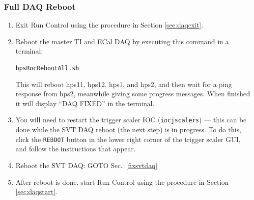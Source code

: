 \documentclass[12pt]{article}
\begin{document}
\subsubsection{Full DAQ Reboot}
\label{fixdaqbig}

\begin{enumerate}
\item Exit Run Control using the procedure in Section \ref{sec:daqexit}.
\item Reboot the master TI and ECal DAQ by executing this command in a terminal:\newline
\centerline{\texttt{hpsRocRebootAll.sh}}
This will reboot hps11, hps12, hps1, and hps2, and then wait for a ping response from hps2, meanwhile giving some progress messages.  When finished it will display ``DAQ FIXED'' in the terminal.

\item You will need to restart the trigger scaler IOC (\texttt{iocjscalers}) --- this can be done while the SVT DAQ reboot (the next step) is in progress. To do this, click the \texttt{REBOOT} button in the lower right corner of the trigger scaler GUI, and follow the instructions that appear.

\item Reboot the SVT DAQ: GOTO Sec.~\ref{fixsvtdaq}

\item After reboot is done, start Run Control using the procedure in Section \ref{sec:daqstart}.
\end{enumerate}
\end{document}

